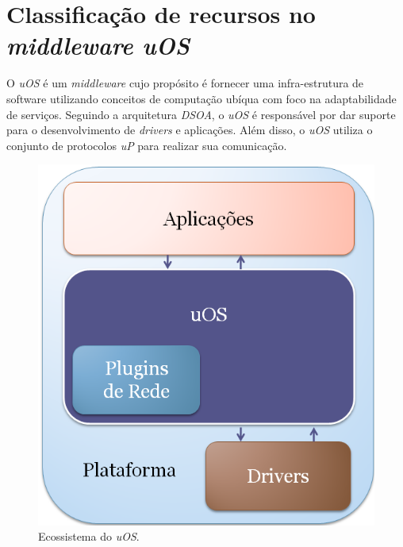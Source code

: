 \section{Classificação de recursos no \emph{middleware uOS}}

O \emph{uOS} é um \emph{middleware} cujo propósito é fornecer uma infra-estrutura de software utilizando conceitos de computação ubíqua com foco na adaptabilidade de serviços. Seguindo a arquitetura \emph{DSOA}, o \emph{uOS} é responsável por dar suporte para o desenvolvimento de \emph{drivers} e aplicações. Além disso, o \emph{uOS} utiliza o conjunto de protocolos \emph{uP} para realizar sua comunicação.

\begin{figure}[ht]
	\center
	\includegraphics[scale=0.4]{imagens/ecossistemaUbiquitos}
	\caption{Ecossistema do \emph{uOS}.}
	\label{fig:ecossistemaUbiquitos}
\end{figure}

